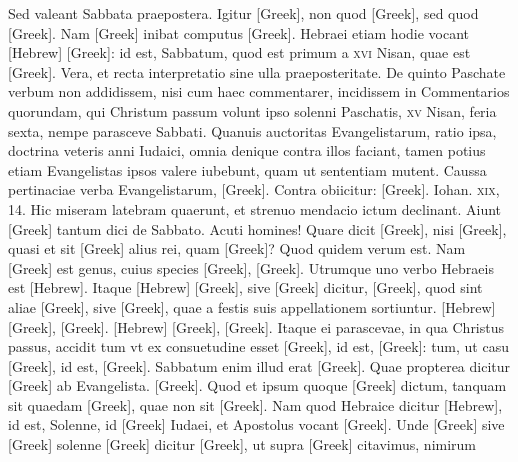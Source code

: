 Sed valeant Sabbata praepostera.
Igitur \textgreek{[Greek]}, non quod \textgreek{[Greek]}, sed
quod \textgreek{[Greek]}.
Nam \textgreek{[Greek]} inibat
computus \textgreek{[Greek]}.
Hebraei etiam hodie vocant \texthebrew{[Hebrew]}
\textgreek{[Greek]}: id est, Sabbatum, quod est primum a
\textsc{xvi} Nisan, quae est \textgreek{[Greek]}.
Vera, et recta interpretatio sine ulla praeposteritate.
De quinto Paschate verbum non addidissem,
nisi cum haec commentarer, incidissem in Commentarios quorundam,
qui Christum passum volunt ipso solenni Paschatis, \textsc{xv}
Nisan, feria sexta, nempe parasceve Sabbati.
Quanuis auctoritas
Evangelistarum, ratio ipsa, doctrina veteris anni Iudaici, omnia
denique contra illos faciant, tamen potius etiam Evangelistas ipsos
valere iubebunt, quam ut sententiam mutent.
Caussa pertinaciae
verba Evangelistarum, \textgreek{[Greek]}.
Contra obiicitur:
\textgreek{[Greek]}.
Iohan. \textsc{xix}, 14.
Hic miseram latebram quaerunt,
et strenuo mendacio ictum declinant.
Aiunt \textgreek{[Greek]} tantum
dici de Sabbato.
Acuti homines!
Quare dicit \textgreek{[Greek]},
nisi \textgreek{[Greek]}, quasi et sit \textgreek{[Greek]}
 alius rei, quam \textgreek{[Greek]}?
Quod quidem verum est.
Nam \textgreek{[Greek]} est genus, cuius species
\textgreek{[Greek]}, \textgreek{[Greek]}.
Utrumque uno verbo Hebraeis est
\texthebrew{[Hebrew]}.
Itaque \texthebrew{[Hebrew]} \textgreek{[Greek]},
 sive \textgreek{[Greek]} dicitur,
\textgreek{[Greek]}, quod sint aliae \textgreek{[Greek]},
 sive \textgreek{[Greek]}, quae a festis
suis appellationem sortiuntur.
\texthebrew{[Hebrew]} \textgreek{[Greek]}, \textgreek{[Greek]}.
\texthebrew{[Hebrew]} \textgreek{[Greek]}, \textgreek{[Greek]}.
Itaque ei parascevae, in qua Christus passus, accidit tum
vt ex consuetudine esset \textgreek{[Greek]}, id est, \textgreek{[Greek]}:
tum, ut casu \textgreek{[Greek]}, id est, \textgreek{[Greek]}.
Sabbatum enim
illud erat \textgreek{[Greek]}.
Quae propterea dicitur \textgreek{[Greek]}
ab Evangelista.
\textgreek{[Greek]}.
Quod
et ipsum quoque \textgreek{[Greek]} dictum, tanquam sit quaedam
 \textgreek{[Greek]},
quae non sit \textgreek{[Greek]}.
Nam quod Hebraice dicitur \texthebrew{[Hebrew]},
id est, Solenne, id \textgreek{[Greek]} Iudaei, et Apostolus vocant
 \textgreek{[Greek]}.
Unde \textgreek{[Greek]} sive \textgreek{[Greek]} solenne
 \textgreek{[Greek]}
dicitur \textgreek{[Greek]}, ut supra \textgreek{[Greek]} citavimus, nimirum
